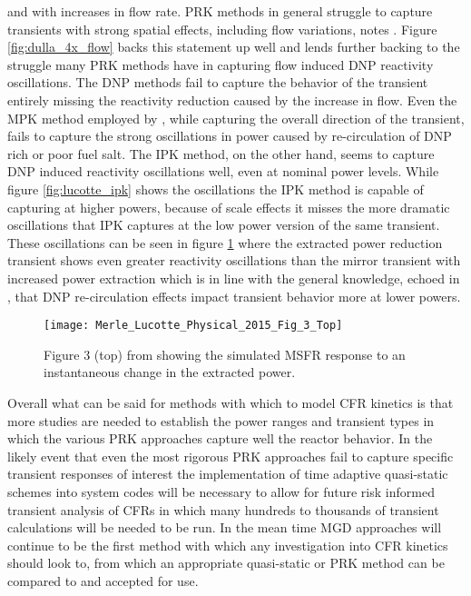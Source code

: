 \documentclass[review]{elsarticle}
\begin{document}
and with increases in flow rate. PRK methods in general struggle to capture
transients with strong spatial effects, including flow variations, notes 
\cite{dulla_models_2005}. Figure \ref{fig:dulla_4x_flow} backs this statement
up well and lends further backing to the struggle many PRK methods have
in capturing flow induced DNP reactivity oscillations. The DNP methods fail
to capture the behavior of the transient entirely missing the reactivity
reduction caused by the increase in flow. Even the MPK method employed by
\cite{dulla_models_2005}, while capturing the overall direction of the
transient, fails to capture the strong oscillations in power caused by
re-circulation of DNP rich or poor fuel salt. The IPK method, on the other hand,
seems to capture DNP induced reactivity oscillations well, even at nominal
power levels. While figure \ref{fig:lucotte_ipk} shows the oscillations the
IPK method is capable of capturing at higher powers, because of scale effects
it misses the more dramatic oscillations that IPK captures at the low power
version of the same transient. These oscillations can be seen in figure
\ref{fig:lucotte_ipk_reac} where the extracted power reduction transient shows
even greater reactivity oscillations than the mirror transient with increased
power extraction which is in line with the general knowledge, echoed in
\cite{zanetti_development_2016}, that DNP re-circulation effects impact
transient behavior more at lower powers.

\begin{figure}[h]
   \centering
   \texttt{[image: Merle\_Lucotte\_Physical\_2015\_Fig\_3\_Top]}
   \caption{Figure 3 (top) from \cite{merle-lucotte_physical_2015} showing the simulated
   MSFR response to an instantaneous change in the extracted power.} 
   \label{fig:lucotte_ipk_reac}
\end{figure}

\par Overall what can be said for methods with which to model CFR kinetics
is that more studies are needed to establish the power ranges and transient
types in which the various PRK approaches capture well the reactor behavior.
In the likely event that even the most rigorous PRK approaches fail to capture
specific transient responses of interest the implementation of time adaptive
quasi-static schemes into system codes will be necessary to allow for future
risk informed transient analysis of CFRs in which many hundreds to thousands
of transient calculations will be needed to be run. In the mean time MGD
approaches will continue to be the first method with which any investigation
into CFR kinetics should look to, from which an appropriate quasi-static or
PRK method can be compared to and accepted for use.
\end{document}
